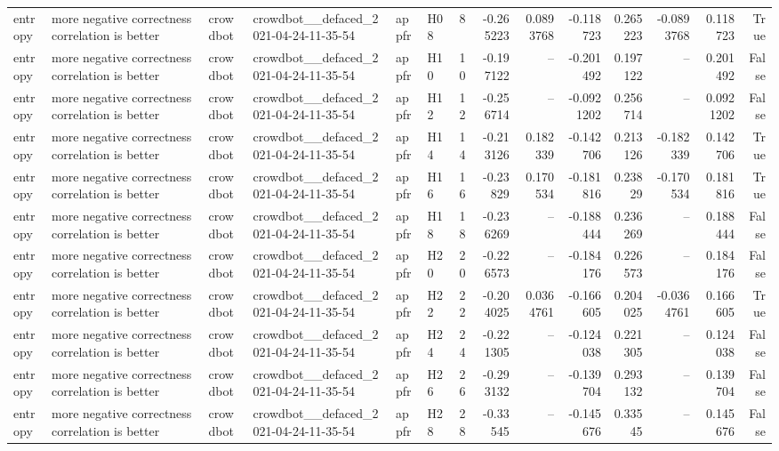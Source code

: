 \begin{longtable}{llllllrrrrrrrr}
entropy & more negative correctness correlation is better & crowdbot & crowdbot\_\_defaced\_2021-04-24-11-35-54 & appfr & H08 & 8 & -0.265223 & 0.0893768 & -0.118723 & 0.265223 & -0.0893768 & 0.118723 & True \\
entropy & more negative correctness correlation is better & crowdbot & crowdbot\_\_defaced\_2021-04-24-11-35-54 & appfr & H10 & 10 & -0.197122 & -- & -0.201492 & 0.197122 & -- & 0.201492 & False \\
entropy & more negative correctness correlation is better & crowdbot & crowdbot\_\_defaced\_2021-04-24-11-35-54 & appfr & H12 & 12 & -0.256714 & -- & -0.0921202 & 0.256714 & -- & 0.0921202 & False \\
entropy & more negative correctness correlation is better & crowdbot & crowdbot\_\_defaced\_2021-04-24-11-35-54 & appfr & H14 & 14 & -0.213126 & 0.182339 & -0.142706 & 0.213126 & -0.182339 & 0.142706 & True \\
entropy & more negative correctness correlation is better & crowdbot & crowdbot\_\_defaced\_2021-04-24-11-35-54 & appfr & H16 & 16 & -0.23829 & 0.170534 & -0.181816 & 0.23829 & -0.170534 & 0.181816 & True \\
entropy & more negative correctness correlation is better & crowdbot & crowdbot\_\_defaced\_2021-04-24-11-35-54 & appfr & H18 & 18 & -0.236269 & -- & -0.188444 & 0.236269 & -- & 0.188444 & False \\
entropy & more negative correctness correlation is better & crowdbot & crowdbot\_\_defaced\_2021-04-24-11-35-54 & appfr & H20 & 20 & -0.226573 & -- & -0.184176 & 0.226573 & -- & 0.184176 & False \\
entropy & more negative correctness correlation is better & crowdbot & crowdbot\_\_defaced\_2021-04-24-11-35-54 & appfr & H22 & 22 & -0.204025 & 0.0364761 & -0.166605 & 0.204025 & -0.0364761 & 0.166605 & True \\
entropy & more negative correctness correlation is better & crowdbot & crowdbot\_\_defaced\_2021-04-24-11-35-54 & appfr & H24 & 24 & -0.221305 & -- & -0.124038 & 0.221305 & -- & 0.124038 & False \\
entropy & more negative correctness correlation is better & crowdbot & crowdbot\_\_defaced\_2021-04-24-11-35-54 & appfr & H26 & 26 & -0.293132 & -- & -0.139704 & 0.293132 & -- & 0.139704 & False \\
entropy & more negative correctness correlation is better & crowdbot & crowdbot\_\_defaced\_2021-04-24-11-35-54 & appfr & H28 & 28 & -0.33545 & -- & -0.145676 & 0.33545 & -- & 0.145676 & False \\

\end{longtable}
